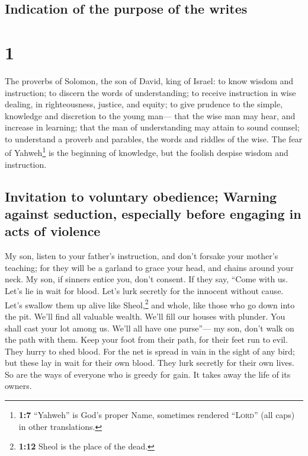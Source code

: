 \hypertarget{indication-of-the-purpose-of-the-writes}{%
\subsection{Indication of the purpose of the
writes}\label{indication-of-the-purpose-of-the-writes}}

\hypertarget{section}{%
\section{1}\label{section}}

 The proverbs of Solomon, the son of David, king of
Israel:  to know wisdom and instruction; to discern the
words of understanding;  to receive instruction in wise
dealing, in righteousness, justice, and equity;  to give
prudence to the simple, knowledge and discretion to the young man---
 that the wise man may hear, and increase in learning;
that the man of understanding may attain to sound counsel;
 to understand a proverb and parables, the words and
riddles of the wise.  The fear of Yahweh\footnote{\textbf{1:7}
  ``Yahweh'' is God's proper Name, sometimes rendered ``\textsc{Lord}''
  (all caps) in other translations.} is the beginning of knowledge, but
the foolish despise wisdom and instruction.

\hypertarget{invitation-to-voluntary-obedience-warning-against-seduction-especially-before-engaging-in-acts-of-violence}{%
\subsection{Invitation to voluntary obedience; Warning against
seduction, especially before engaging in acts of
violence}\label{invitation-to-voluntary-obedience-warning-against-seduction-especially-before-engaging-in-acts-of-violence}}

 My son, listen to your father's instruction, and don't
forsake your mother's teaching;  for they will be a
garland to grace your head, and chains around your neck. 
My son, if sinners entice you, don't consent.  If they
say, ``Come with us. Let's lie in wait for blood. Let's lurk secretly
for the innocent without cause.  Let's swallow them up
alive like Sheol,\footnote{\textbf{1:12} Sheol is the place of the dead.}
and whole, like those who go down into the pit.  We'll
find all valuable wealth. We'll fill our houses with plunder.
 You shall cast your lot among us. We'll all have one
purse''---  my son, don't walk on the path with them.
Keep your foot from their path,  for their feet run to
evil. They hurry to shed blood.  For the net is spread in
vain in the sight of any bird;  but these lay in wait for
their own blood. They lurk secretly for their own lives. 
So are the ways of everyone who is greedy for gain. It takes away the
life of its owners.

